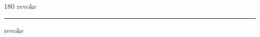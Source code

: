 
\begin{frame}
\begin{center}
\begin{turn}{180}
{\fontsize{2.5cm}{1em}\selectfont revoke}
\end{turn}
\vspace{1em}\par  
\hrule
\vspace{1em}\par  
{\fontsize{2.5cm}{1em}\selectfont revoke}
\end{center}
\end{frame}
